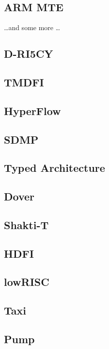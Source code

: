\subsection{ARM MTE}
\dots and some more \dots 

\subsection{D-RI5CY}

\subsection{TMDFI}

\subsection{HyperFlow} 

\subsection{SDMP}

\subsection{Typed Architecture}

\subsection{Dover}

\subsection{Shakti-T}

\subsection{HDFI}

\subsection{lowRISC}

\subsection{Taxi}

\subsection{Pump}

